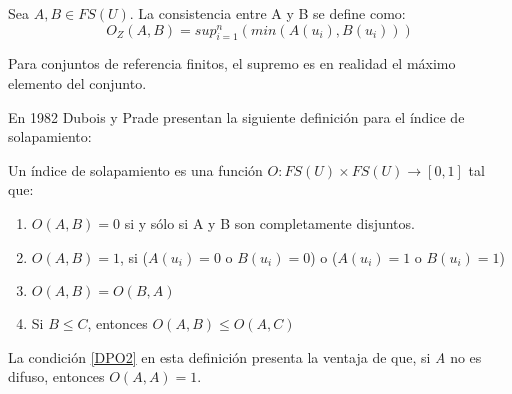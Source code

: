 \begin{definition}
Sea $A,B \in FS(U)$. La consistencia entre A y B se define como:
\begin{equation}\label{eq:zadeh-consistency}
O_{Z}(A,B) = sup_{i=1}^{n}(min(A(u_{i}),B(u_{i})))
\end{equation}
\end{definition}

Para conjuntos de referencia finitos, el supremo es en realidad el máximo elemento del conjunto.

En 1982 Dubois y Prade \cite{dubois2000} presentan la siguiente definición para el índice de solapamiento:

\begin{definition}
Un índice de solapamiento es una función $O : FS(U) \times FS(U) \rightarrow [0,1]$ tal que:
\begin{enumerate}[label=(O\arabic*),ref=(O\arabic*)]
\item $O(A,B) = 0$ si y sólo si A y B son completamente disjuntos. \label{DP01}
\item $O(A,B) = 1$, si ($A(u_{i}) = 0$ o $B(u_{i}) = 0$) o ($A(u_{i}) = 1$ o $B(u_{i}) = 1$) \label{DPO2}
\item $O(A,B) = O(B,A)$ \label{DPO3}
\item Si $B \leq C$, entonces $O(A,B) \leq O(A,C)$ \label{DPO4}
\end{enumerate}
\label{def:dubois-overlap-index}
\end{definition}
La condición \ref{DPO2} en esta definición presenta la ventaja de que, si \emph{A} no es difuso, entonces $O(A,A) = 1$.

